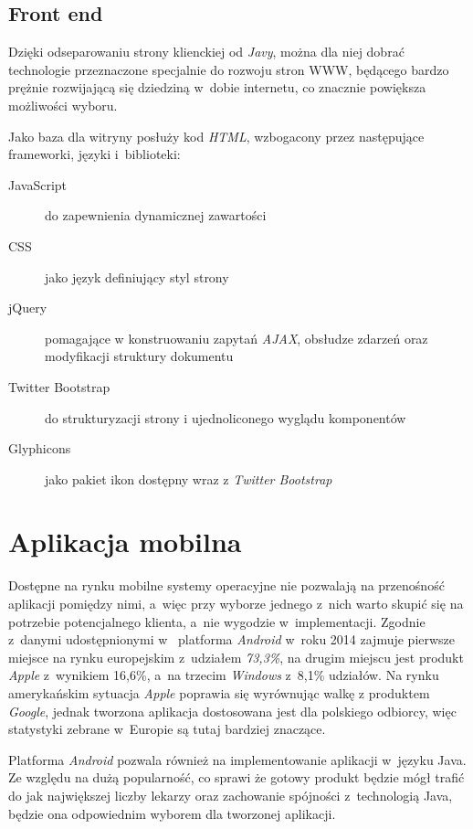 \documentclass[11pt]{aghdpl}
\begin{document}
\subsection{Front end}
Dzięki odseparowaniu strony klienckiej od \emph{Javy}, można dla niej dobrać technologie przeznaczone specjalnie do rozwoju stron WWW, będącego bardzo prężnie rozwijającą się dziedziną w~dobie internetu, co znacznie powiększa możliwości wyboru.

Jako baza dla witryny posłuży kod \emph{HTML}, wzbogacony przez następujące frameworki, języki i~biblioteki:

\begin{description}
\item[JavaScript] do zapewnienia dynamicznej zawartości
\item[CSS] jako język definiujący styl strony
\item[jQuery] pomagające w konstruowaniu zapytań \emph{AJAX}, obsłudze zdarzeń oraz modyfikacji struktury dokumentu
\item[Twitter Bootstrap] do strukturyzacji strony i ujednoliconego wyglądu komponentów
\item[Glyphicons] jako pakiet ikon dostępny wraz z \emph{Twitter Bootstrap}
\end{description}

\section{Aplikacja mobilna}

Dostępne na rynku mobilne systemy operacyjne nie pozwalają na przenośność aplikacji pomiędzy nimi, a~więc przy wyborze jednego z~nich warto skupić się na potrzebie potencjalnego klienta, a~nie wygodzie w~implementacji. Zgodnie z~danymi udostępnionymi w~\cite{AMS} platforma \emph{Android} w~roku 2014 zajmuje pierwsze miejsce na rynku europejskim z~udziałem \emph{73,3\%}, na drugim miejscu jest produkt \emph{Apple} z~wynikiem 16,6\%, a~na trzecim \emph{Windows} z~8,1\% udziałów. Na rynku amerykańskim sytuacja \emph{Apple} poprawia się wyrównując walkę z produktem \emph{Google}, jednak tworzona aplikacja dostosowana jest dla polskiego odbiorcy, więc statystyki zebrane w~Europie są tutaj bardziej znaczące.

Platforma \emph{Android} pozwala również na implementowanie aplikacji w~języku Java. Ze względu na dużą popularność, co sprawi że gotowy produkt będzie mógł trafić do jak największej liczby lekarzy oraz zachowanie spójności z~technologią Java, będzie ona odpowiednim wyborem dla tworzonej aplikacji.
\end{document}
